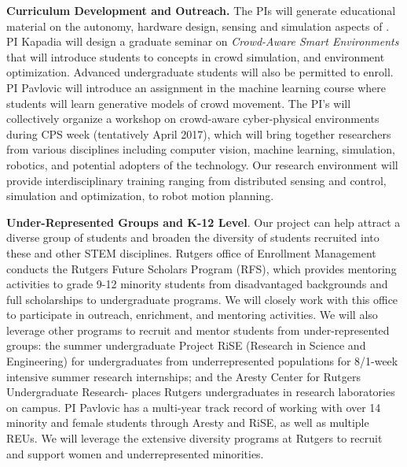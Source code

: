 \noindent \textbf{Curriculum Development and Outreach.} The PIs will generate educational material on the autonomy, hardware design, sensing and simulation aspects of \precise. PI Kapadia will design a graduate seminar on \emph{Crowd-Aware Smart Environments} that will introduce students to concepts in crowd simulation, and environment optimization. Advanced undergraduate students will also be permitted to enroll. PI Pavlovic will introduce an assignment in the machine learning course where students will learn generative models of crowd movement. The PI's will collectively organize a workshop on crowd-aware cyber-physical environments during CPS week (tentatively April 2017), which will bring together researchers from various disciplines including computer vision, machine learning, simulation, robotics, and potential adopters of the technology. Our research environment will provide interdisciplinary training ranging from distributed sensing and control, simulation and optimization, to robot motion planning.

\noindent \textbf{Under-Represented Groups and K-12 Level}. Our project can help attract a diverse group of students and broaden the diversity of students recruited into these and other STEM disciplines. Rutgers office of Enrollment Management conducts the Rutgers Future Scholars Program (RFS), which provides mentoring activities to grade 9-12 minority students from disadvantaged backgrounds and full scholarships to undergraduate programs. We will closely work with this office to participate in outreach, enrichment, and mentoring activities. We will also leverage other programs to recruit and mentor students from under-represented groups: the summer undergraduate Project RiSE (Research in Science and Engineering) for undergraduates from underrepresented populations for 8/1-week intensive summer research internships; and the Aresty Center for Rutgers Undergraduate Research- places Rutgers undergraduates in research laboratories on campus. PI Pavlovic has a multi-year track record of working with over 14 minority and female students through Aresty and RiSE, as well as multiple REUs. We will leverage the extensive diversity programs at Rutgers to recruit and support women and underrepresented minorities.
